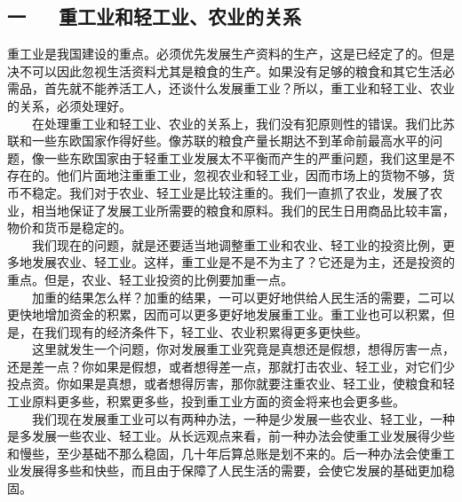 \documentclass[cn,11pt,chinese]{elegantbook}
\def\myformat#1{\hfil\hfil #1}
\begin{document}
\subsection*{\myformat{一 　  重工业和轻工业、农业的关系}}
重工业是我国建设的重点。必须优先发展生产资料的生产，这是已经定了的。但是决不可以因此忽视生活资料尤其是粮食的生产。如果没有足够的粮食和其它生活必需品，首先就不能养活工人，还谈什么发展重工业？所以，重工业和轻工业、农业的关系，必须处理好。\\
　　在处理重工业和轻工业、农业的关系上，我们没有犯原则性的错误。我们比苏联和一些东欧国家作得好些。像苏联的粮食产量长期达不到革命前最高水平的问题，像一些东欧国家由于轻重工业发展太不平衡而产生的严重问题，我们这里是不存在的。他们片面地注重重工业，忽视农业和轻工业，因而市场上的货物不够，货币不稳定。我们对于农业、轻工业是比较注重的。我们一直抓了农业，发展了农业，相当地保证了发展工业所需要的粮食和原料。我们的民生日用商品比较丰富，物价和货币是稳定的。\\
　　我们现在的问题，就是还要适当地调整重工业和农业、轻工业的投资比例，更多地发展农业、轻工业。这样，重工业是不是不为主了？它还是为主，还是投资的重点。但是，农业、轻工业投资的比例要加重一点。\\
　　加重的结果怎么样？加重的结果，一可以更好地供给人民生活的需要，二可以更快地增加资金的积累，因而可以更多更好地发展重工业。重工业也可以积累，但是，在我们现有的经济条件下，轻工业、农业积累得更多更快些。\\
　　这里就发生一个问题，你对发展重工业究竟是真想还是假想，想得厉害一点，还是差一点？你如果是假想，或者想得差一点，那就打击农业、轻工业，对它们少投点资。你如果是真想，或者想得厉害，那你就要注重农业、轻工业，使粮食和轻工业原料更多些，积累更多些，投到重工业方面的资金将来也会更多些。\\
　　我们现在发展重工业可以有两种办法，一种是少发展一些农业、轻工业，一种是多发展一些农业、轻工业。从长远观点来看，前一种办法会使重工业发展得少些和慢些，至少基础不那么稳固，几十年后算总账是划不来的。后一种办法会使重工业发展得多些和快些，而且由于保障了人民生活的需要，会使它发展的基础更加稳固。\\
\end{document}
